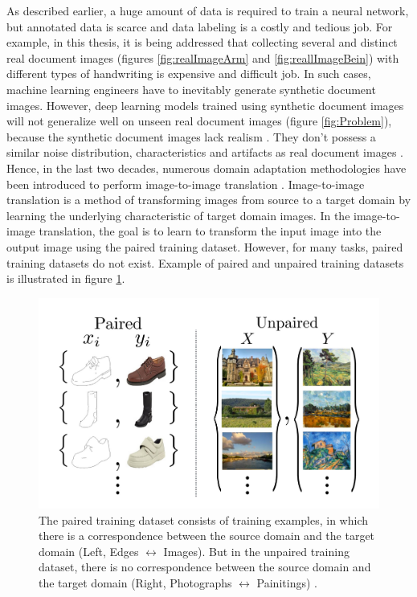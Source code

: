 As described earlier, a huge amount of data is required to train a neural network, but annotated data is scarce and data labeling is a costly and tedious job. For example, in this thesis, it is being addressed that collecting several and distinct real document images (figures \ref{fig:realImageArm} and \ref{fig:reallImageBein}) with different types of handwriting is expensive and difficult job. In such cases, machine learning engineers have to inevitably generate synthetic document images. However, deep learning models trained using synthetic document images will not generalize well on unseen real document images (figure \ref{fig:Problem}), because the synthetic document images lack realism  \cite{8978087}. They don't possess a similar noise distribution, characteristics and artifacts as real document images \cite{8978087}. Hence, in the last two decades, numerous domain adaptation methodologies have been introduced to perform image-to-image translation \cite{8978011}. Image-to-image translation is a method of transforming images from source to a target domain by learning the underlying characteristic of target domain images. In the image-to-image translation, the goal is to learn to transform the input image into the output image using the paired training dataset. However, for many tasks, paired training datasets do not exist. Example of paired and unpaired training datasets is illustrated in figure \ref{fig:pairedUnpaired}. 





\begin{figure}[H]
        \begin{center}
	    \includegraphics[scale=0.50]{images/Introduction/pairedUnpaired.JPG}
	    \caption[Examples of the paired training dataset and the unpaired training dataset.]{The paired training dataset consists of training examples, in which there is a correspondence between the source domain and the target domain (Left, Edges $\leftrightarrow$ Images). But in the unpaired training dataset, there is no correspondence between the source domain and the target domain (Right, Photographs $\leftrightarrow$ Painitings) \cite{zhu2020unpaired}.}
	    \label{fig:pairedUnpaired}
	    \end{center}
\end{figure}


